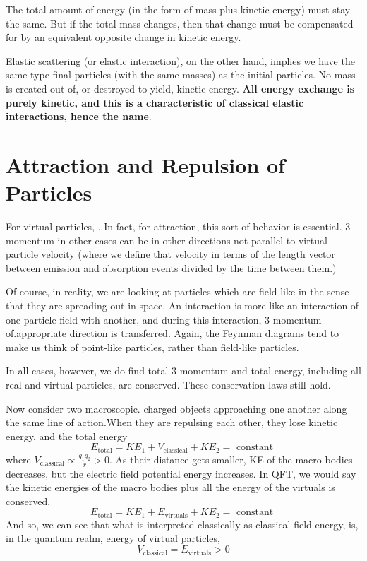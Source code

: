 The total amount of energy (in the form of mass plus kinetic energy) must stay the same. But if the total mass changes, then that change must be compensated for by an equivalent opposite change in kinetic energy.

Elastic scattering (or elastic interaction), on the other hand, implies we have the same type final particles (with the same masses) as the initial particles. No mass is created out of, or destroyed to yield, kinetic energy. \textbf{All energy exchange is purely kinetic, and this is a characteristic of classical elastic interactions, hence the name}.

\section{Attraction and Repulsion of Particles}
For virtual particles, . In fact, for attraction, this sort of behavior is essential. 3-momentum in other cases can be in other directions not parallel to virtual particle velocity (where we define that velocity in terms of the length vector between emission and absorption events divided by the time between them.)

Of course, in reality, we are looking at particles which are field-like in the sense that they are
spreading out in space. An interaction is more like an interaction of one particle field with another, and during this interaction, 3-momentum of.appropriate direction is transferred. Again, the Feynman diagrams tend to make us think of point-like particles, rather than field-like particles.

In all cases, however, we do find total 3-momentum and total energy, including all real and virtual particles, are conserved. These conservation laws still hold.

Now consider two macroscopic. charged objects approaching one another along the same line of action.When they are repulsing each other, they lose kinetic energy, and the total energy
$$
E_{\text {total}}=K E_{1}+V_{\text {classical}}+K E_{2}=\text { constant }
$$
where $V_{\text {classical}} \propto \frac{q_{1} q_{2}}{r}>0$. As their distance gets smaller, KE of the macro bodies decreases, but the electric field potential energy increases. In QFT, we would say the kinetic energies of the macro bodies plus all the energy of the virtuals is conserved,
$$
E_{\text {total}}=K E_{1}+E_{\text {virtuals}}+K E_{2}=\text { constant }
$$
And so, we can see that what is interpreted classically as classical field energy, is, in the quantum realm, energy of virtual particles,
$$
V_{\text {classical}}=E_{\text {virtuals}}>0
$$

